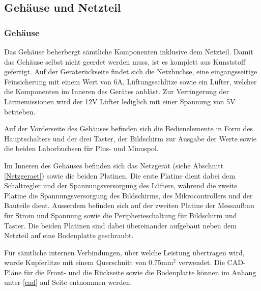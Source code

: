 \subsection{Gehäuse und Netzteil}

\subsubsection{Gehäuse}
Das Gehäuse beherbergt sämtliche Komponenten inklusive dem Netzteil. Damit das Gehäuse selbst nicht geerdet werden muss, ist es komplett aus Kunststoff gefertigt. Auf der Geräterückseite findet sich die Netzbuchse, eine eingangsseitige Feinsicherung mit einem Wert von 6A, Lüftungsschlitze sowie ein Lüfter, welcher die Komponenten im Inneren des Gerätes anbläst. Zur Verringerung der Lärmemissionen wird der 12V Lüfter lediglich mit einer Spannung von 5V betrieben.

Auf der Vorderseite des Gehäuses befinden sich die Bedienelemente in Form des Hauptschalters und der drei Taster, der Bildschirm zur Ausgabe der Werte sowie die beiden Laborbuchsen für Plus- und Minuspol.

Im Inneren des Gehäuses befinden sich das Netzgerät (siehe Abschnitt \ref{Netzgeraet}) sowie die beiden Platinen. Die erste Platine dient dabei dem Schaltregler und der Spannungsversorgung des Lüfters, während die zweite Platine die Spannungsversorgung des Bildschirms, des Mikrocontrollers und der Bauteile dient. Ausserdem befinden sich auf der zweiten Platine der Messaufbau für Strom und Spannung sowie die Peripherieschaltung für Bildschirm und Taster. Die beiden Platinen sind dabei übereinander aufgebaut neben dem Netzteil auf eine Bodenplatte geschraubt.

Für sämtliche internen Verbindungen, über welche Leistung übertragen wird, wurde Kupferlitze mit einem Querschnitt von 0.75mm$^2$ verwendet. Die CAD-Pläne für die Front- und die Rückseite sowie die Bodenplatte können im Anhang unter \ref{cad} auf Seite \pageref{cad} entnommen werden.


